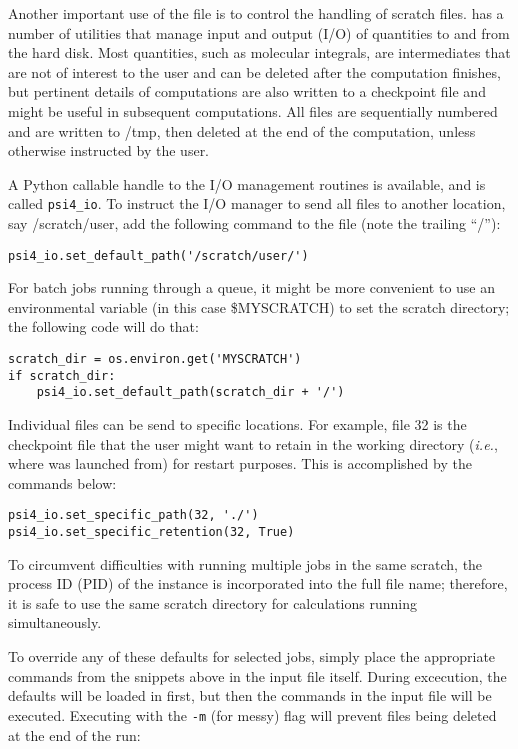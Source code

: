 Another important use of the \psirc file is to control the
handling of scratch files.  \PSIfour has a number of utilities that manage
input and output (I/O) of quantities to and from the hard disk.  Most
quantities, such as molecular integrals, are intermediates that are not of
interest to the user and can be deleted after the computation finishes, but
pertinent details of computations are also written to a checkpoint file and
might be useful in subsequent computations.  All files are sequentially
numbered and are written to /tmp, then deleted at the end of the computation,
unless otherwise instructed by the user.

A Python callable handle to the \PSIfour I/O management routines is available,
and is called {\tt psi4\_io}.  To instruct the I/O manager to send all files to
another location, say /scratch/user, add the following command to the \psirc
file (note the trailing ``/''):

\begin{verbatim}
psi4_io.set_default_path('/scratch/user/')
\end{verbatim}

For batch jobs running through a queue, it might be more convenient to use an
environmental variable (in this case \$MYSCRATCH) to set the scratch directory;
the following code will do that:

\begin{verbatim}
scratch_dir = os.environ.get('MYSCRATCH')
if scratch_dir:
    psi4_io.set_default_path(scratch_dir + '/')
\end{verbatim}

Individual files can be send to specific locations.  For example, file 32 is
the checkpoint file that the user might want to retain in the working directory
({\it i.e.}, where \PSIfour was launched from) for restart purposes.  This is
accomplished by the commands below:

\begin{verbatim}
psi4_io.set_specific_path(32, './')
psi4_io.set_specific_retention(32, True)
\end{verbatim}

To circumvent difficulties with running multiple jobs in the same scratch, the
process ID (PID) of the \PSIfour instance is incorporated into the full file
name; therefore, it is safe to use the same scratch directory for calculations
running simultaneously.

To override any of these defaults for selected jobs, simply place the
appropriate commands from the snippets above in the input file itself.  During
excecution, the \psirc defaults will be loaded in first, but then the commands
in the input file will be executed.  Executing \PSIfour with the {\tt -m} (for
messy) flag will prevent files being deleted at the end of the run:

